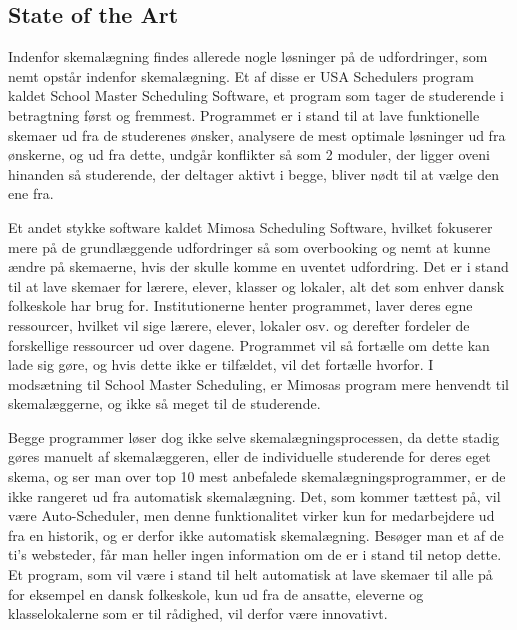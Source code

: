\subsection{State of the Art}
Indenfor skemalægning findes allerede nogle løsninger på de udfordringer, som nemt opstår indenfor skemalægning. Et af disse er USA Schedulers program kaldet School Master Scheduling Software\cite{USAS}, et program som tager de studerende i betragtning først og fremmest. Programmet er i stand til at lave funktionelle skemaer ud fra de studerenes ønsker, analysere de mest optimale løsninger ud fra ønskerne, og ud fra dette, undgår konflikter så som 2 moduler, der ligger oveni hinanden så studerende, der deltager aktivt i begge, bliver nødt til at vælge den ene fra.

Et andet stykke software kaldet Mimosa Scheduling Software\cite{Mimosa}, hvilket fokuserer mere på de grundlæggende udfordringer så som overbooking og nemt at kunne ændre på skemaerne, hvis der skulle komme en uventet udfordring. Det er i stand til at lave skemaer for lærere, elever, klasser og lokaler, alt det som enhver dansk folkeskole har brug for. Institutionerne henter programmet, laver deres egne ressourcer, hvilket vil sige lærere, elever, lokaler osv. og derefter fordeler de forskellige ressourcer ud over dagene. Programmet vil så fortælle om dette kan lade sig gøre, og hvis dette ikke er tilfældet, vil det fortælle hvorfor\cite{MimosaTutorial}. I modsætning til School Master Scheduling, er Mimosas program mere henvendt til skemalæggerne, og ikke så meget til de studerende. 

Begge programmer løser dog ikke selve skemalægningsprocessen, da dette stadig gøres manuelt af skemalæggeren, eller de individuelle studerende for deres eget skema, og ser man over top 10 mest anbefalede skemalægningsprogrammer\cite{top10Schedulers}, er de ikke rangeret ud fra automatisk skemalægning. Det, som kommer tættest på, vil være Auto-Scheduler, men denne funktionalitet virker kun for medarbejdere ud fra en historik, og er derfor ikke automatisk skemalægning. Besøger man et af de ti's websteder, får man heller ingen information om de er i stand til netop dette. Et program, som vil være i stand til helt automatisk at lave skemaer til alle på for eksempel en dansk folkeskole, kun ud fra de ansatte, eleverne og klasselokalerne som er til rådighed, vil derfor være innovativt.

